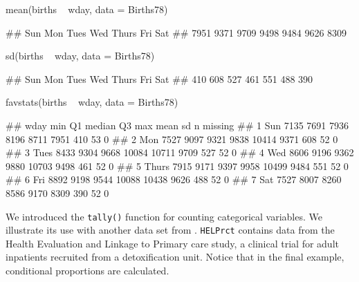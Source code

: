 \begin{Schunk}
\begin{Sinput}
mean(births ~ wday, data = Births78)
\end{Sinput}
\begin{Soutput}
##   Sun   Mon  Tues   Wed Thurs   Fri   Sat 
##  7951  9371  9709  9498  9484  9626  8309
\end{Soutput}
\begin{Sinput}
sd(births ~ wday, data = Births78)
\end{Sinput}
\begin{Soutput}
##   Sun   Mon  Tues   Wed Thurs   Fri   Sat 
##   410   608   527   461   551   488   390
\end{Soutput}
\begin{Sinput}
favstats(births ~ wday, data = Births78)
\end{Sinput}
\begin{Soutput}
##    wday  min   Q1 median    Q3   max mean  sd  n missing
## 1   Sun 7135 7691   7936  8196  8711 7951 410 53       0
## 2   Mon 7527 9097   9321  9838 10414 9371 608 52       0
## 3  Tues 8433 9304   9668 10084 10711 9709 527 52       0
## 4   Wed 8606 9196   9362  9880 10703 9498 461 52       0
## 5 Thurs 7915 9171   9397  9958 10499 9484 551 52       0
## 6   Fri 8892 9198   9544 10088 10438 9626 488 52       0
## 7   Sat 7527 8007   8260  8586  9170 8309 390 52       0
\end{Soutput}
\end{Schunk}

\noindent
We introduced the \texttt{tally()} function for counting categorical
variables. We illustrate its use with another data set from
 \citep{mosaicData}. \texttt{HELPrct} contains data
from the Health Evaluation and Linkage to Primary care study, a clinical
trial for adult inpatients recruited from a detoxification unit. Notice
that in the final example, conditional proportions are calculated.

